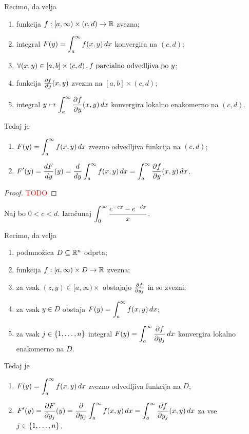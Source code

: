 \begin{trditev}
    Recimo, da velja
    \begin{enumerate}
        \item funkcija \(f:[a, \infty) \times (c,d) \to \mathbb{R}\) zvezna;
        \item integral \(\displaystyle F(y) = \int_{a}^{\infty} f(x,y) \, dx\) konvergira na \((c,d)\);
        \item $\forall (x,y) \in [a,b] \times (c,d) \,.\, f \text{ parcialno odvedljiva po } y$;
        \item funkcija $\frac{\partial f}{\partial y}(x,y)$ zvezna na $[a,b] \times (c,d)$;
        \item integral \(\displaystyle y \mapsto \int_{a}^{\infty} \frac{\partial f}{\partial y}(x,y) \, dx\) konvergira lokalno enakomerno na \((c,d)\).
    \end{enumerate}
    Tedaj je 
    \begin{enumerate}
        \item $\displaystyle F(y) = \int_{a}^{\infty}f(x,y) \, dx$ zvezno odvedljiva funkcija na $(c,d)$;
        \item $\displaystyle F'(y) = \frac{dF}{dy}(y) = \frac{d}{dy} \int_{a}^{\infty}f(x,y) \, dx = \int_{a}^{\infty} \frac{\partial f}{\partial y}(x,y) \, dx$.
    \end{enumerate}    
\end{trditev}

\begin{proof}
    \textcolor{red}{TODO}
\end{proof}

\begin{zgled}
    Naj bo \(0<c<d\). Izračunaj \(\displaystyle \int_{0}^{\infty} \frac{e^{-cx} - e^{-dx}}{x}\).
\end{zgled}

\begin{trditev}
    Recimo, da velja
    \begin{enumerate}
        \item podmnožica \(D \subseteq \mathbb{R}^n\) odprta; 
        \item funkcija \(f:[a,\infty) \times D \to \mathbb{R}\) zvezna;
        \item za vsak \((z,y) \in [a,\infty) \times \) obstajajo \(\frac{\partial f}{\partial y_j}\) in so zvezni;
        \item za vsak \(y \in D\) obstaja \(\displaystyle F(y) = \int_{a}^{\infty} f(x,y) \, dx\);
        \item za vsak \(j \in \{1, \ldots, n\}\) integral \(\displaystyle F(y) = \int_{a}^{\infty} \frac{\partial f}{\partial y_j} \, dx\) konvergira lokalno enakomerno na \(D\).
    \end{enumerate}
    Tedaj je
    \begin{enumerate}
        \item $\displaystyle F(y) = \int_{a}^{\infty}f(x,y) \, dx$ zvezno odvedljiva funkcija na $D$;
        \item $\displaystyle F'(y) = \frac{\partial F}{\partial y_j}(y) = \frac{\partial}{\partial y_j} \int_{a}^{\infty}f(x,y) \, dx = \int_{a}^{\infty} \frac{\partial f}{\partial y_j}(x,y) \, dx$ za vse \(j \in \{1, \ldots, n\}\).
    \end{enumerate}    
\end{trditev}

